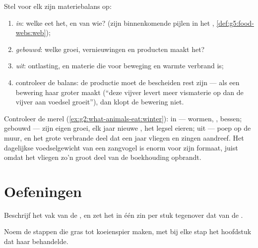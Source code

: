 \begin{method}\label{met:g6:matter-from-food:audit}
Stel voor elk  zijn materiebalans op:
\begin{enumerate}
  \item \emph{in}: welke  eet het, en van wie? (zijn
        binnenkomende pijlen in het ,
        \cref{def:g5:food-webs:web});
  \item \emph{gebouwd}: welke groei, vernieuwingen en producten maakt
        het?
  \item \emph{uit}: ontlasting, en materie die voor beweging en warmte
        verbrand is;
  \item controleer de balans: de productie moet de bescheiden rest zijn
        --- als een bewering haar groter maakt (``deze vijver levert
        meer vismaterie op dan de vijver aan voedsel groeit''), dan
        klopt de bewering niet.
\end{enumerate}
\end{method}

\begin{example}\label{ex:g6:matter-from-food:audituse}
Controleer de merel (\cref{ex:g2:what-animals-eat:winter}): in ---
wormen, , bessen; gebouwd --- zijn eigen groei, elk jaar nieuwe
, het legsel eieren; uit --- poep op de muur, en het grote verbrande
deel dat een jaar vliegen en zingen aandreef. Het dagelijkse
voedselgewicht van een zangvogel is enorm voor zijn formaat, juist omdat
het vliegen zo'n groot deel van de boekhouding opbrandt.
\end{example}

\section{Oefeningen}

\begin{exercise}[$\star$]\label{exo:g6:matter-from-food:1}
Beschrijf het vak van de , en zet het in één zin per stuk
tegenover dat van de .
\end{exercise}

\begin{exercise}[$\star$]\label{exo:g6:matter-from-food:2}
Noem de stappen die gras tot koeienspier maken, met bij elke stap het
hoofdstuk dat haar behandelde.
\end{exercise}

